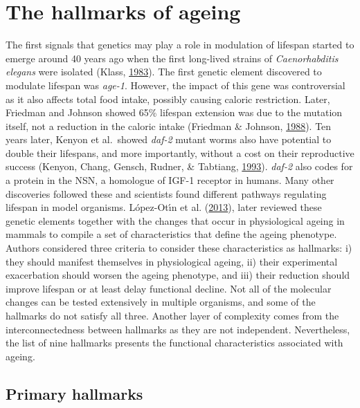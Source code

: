 \documentclass[12pt,twoside]{unicam}
\begin{document}
\hypertarget{introHallmarks}{%
\section{The hallmarks of ageing}\label{introHallmarks}}

The first signals that genetics may play a role in modulation of lifespan started to emerge around 40 years ago when the first long-lived strains of \emph{Caenorhabditis elegans} were isolated (Klass, \protect\hyperlink{ref-Klass1983}{1983}). The first genetic element discovered to modulate lifespan was \emph{age-1}. However, the impact of this gene was controversial as it also affects total food intake, possibly causing caloric restriction. Later, Friedman and Johnson showed 65\% lifespan extension was due to the mutation itself, not a reduction in the caloric intake (Friedman \& Johnson, \protect\hyperlink{ref-Friedman1988}{1988}). Ten years later, Kenyon et al.~showed \emph{daf-2} mutant worms also have potential to double their lifespans, and more importantly, without a cost on their reproductive success (Kenyon, Chang, Gensch, Rudner, \& Tabtiang, \protect\hyperlink{ref-Kenyon1993}{1993}). \emph{daf-2} also codes for a protein in the NSN, a homologue of IGF-1 receptor in humans. Many other discoveries followed these and scientists found different pathways regulating lifespan in model organisms. López-Otı́n et al. (\protect\hyperlink{ref-Lopez-Otin2013}{2013}), later reviewed these genetic elements together with the changes that occur in physiological ageing in mammals to compile a set of characteristics that define the ageing phenotype. Authors considered three criteria to consider these characteristics as hallmarks: i) they should manifest themselves in physiological ageing, ii) their experimental exacerbation should worsen the ageing phenotype, and iii) their reduction should improve lifespan or at least delay functional decline. Not all of the molecular changes can be tested extensively in multiple organisms, and some of the hallmarks do not satisfy all three. Another layer of complexity comes from the interconnectedness between hallmarks as they are not independent. Nevertheless, the list of nine hallmarks presents the functional characteristics associated with ageing.

\hypertarget{introPrimaryHallmarks}{%
\subsection{Primary hallmarks}\label{introPrimaryHallmarks}}
\end{document}
